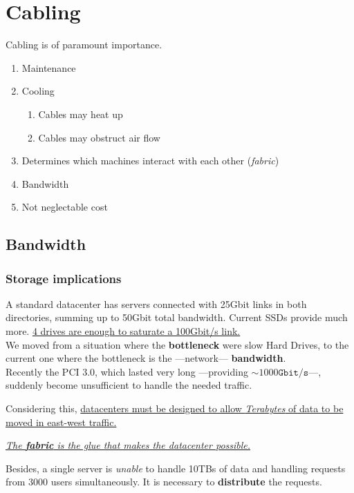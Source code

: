 \chapter{Cabling}
Cabling is of paramount importance.
\begin{enumerate}
   \item Maintenance
   \item Cooling
   \begin{enumerate}
      \item Cables may heat up
      \item Cables may obstruct air flow
   \end{enumerate}
   \item Determines which machines interact with each other (\textit{fabric})
   \item Bandwidth
   \item Not neglectable cost
\end{enumerate}

\section{Bandwidth}

\subsection{Storage implications}
A standard datacenter has servers connected with 25Gbit links in both directories, summing up to 50Gbit total bandwidth.
Current SSDs provide much more. \ul{4 drives are enough to saturate a 100Gbit/s link.}\\
We moved from a situation where the \textbf{bottleneck} were slow Hard Drives, to the current one where the bottleneck is the ---network--- \textbf{bandwidth}.\\
Recently the PCI 3.0, which lasted very long ---providing $\sim 1000\texttt{Gbit/s}$---, suddenly become unsufficient to handle the needed traffic.

Considering this, \ul{datacenters must be designed to allow \textit{Terabytes} of data to be moved in east-west traffic.}

\begin{center}
   \ul{\textit{The \textbf{fabric} is the glue that makes the datacenter possible.}}
\end{center}

Besides, a single server is \textit{unable} to handle 10TBs of data and handling requests from 3000 users simultaneously. It is necessary to \textbf{distribute} the requests.

